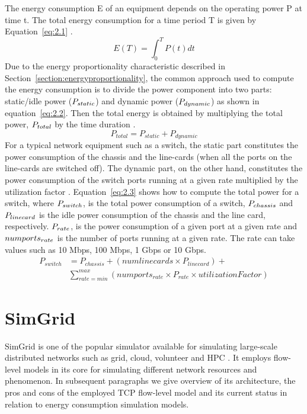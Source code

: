 The energy consumption E of an equipment depends on the operating power P at time t. The total energy consumption for a time period T is given by Equation~\ref{eq:2.1} \cite{DBLP:conf/wowmom/OrgerieLLL11}. 
\begin{equation} \label{eq:2.1}
  E(T) = \int_{0}^{T} P(t) dt
\end{equation} 
Due to the energy proportionality characteristic described in Section~\ref{section:energyproportionality}, the common approach used to compute the energy consumption is to divide the power component into two parts: static/idle power (\($$P_{static}$$\)) and dynamic power (\($$P_{dynamic}$$\)) as shown in equation~\ref{eq:2.2}. Then the total energy is obtained by multiplying the total power, \($$P_{total}$$\) by the time duration \cite{DBLP:conf/wowmom/OrgerieLLL11,DBLP:journals/tjs/KliazovichBK12,DBLP:conf/networking/MahadevanSBR09,DBLP:journals/comsur/DayarathnaWF16}. 
\begin{equation} \label{eq:2.2}
 P_{total} = P_{static} + P_{dynamic}
\end{equation} 
For a typical network equipment such as a switch, the static part constitutes the power consumption of the chassis and the line-cards (when all the ports on the line-cards are switched off). The dynamic part, on the other hand, constitutes the power consumption of the switch ports running at a given rate multiplied by the utilization factor \cite{DBLP:conf/networking/MahadevanSBR09}. Equation~\ref{eq:2.3} shows how to compute the total power for a switch, where \($$P_{switch}$$\), is the total power consumption of a switch, \($$P_{chassis}$$\) and \($$P_{linecard}$$\) is the idle power consumption of the chassis and the line card, respectively. \($$P_{rate}$$\), is the power consumption of a given port at a given rate and \($$numports_{rate}$$\) is the number of ports running at a given rate. The rate can take values such as 10 Mbps, 100 Mbps, 1 Gbps or 10 Gbps.
\begin{equation} \label{eq:2.3}
\begin{split}
P_{switch} &= P_{chassis} + (numlinecards \times P_{linecard})  + \\
&\sum_{rate=min}^{max} (numports_{rate} \times P_{rate} \times utilizationFactor)
\end{split}
\end{equation}

\section{SimGrid}
\label{section:simgrid} 
SimGrid is one of the popular simulator available for simulating large-scale distributed networks such as grid, cloud, volunteer and HPC \cite{simgrid}. It employs flow-level models in its core for simulating different network resources and phenomenon. In subsequent paragraphs we give overview of its architecture, the pros and cons of the employed TCP flow-level model and its current status in relation to energy consumption simulation models.

